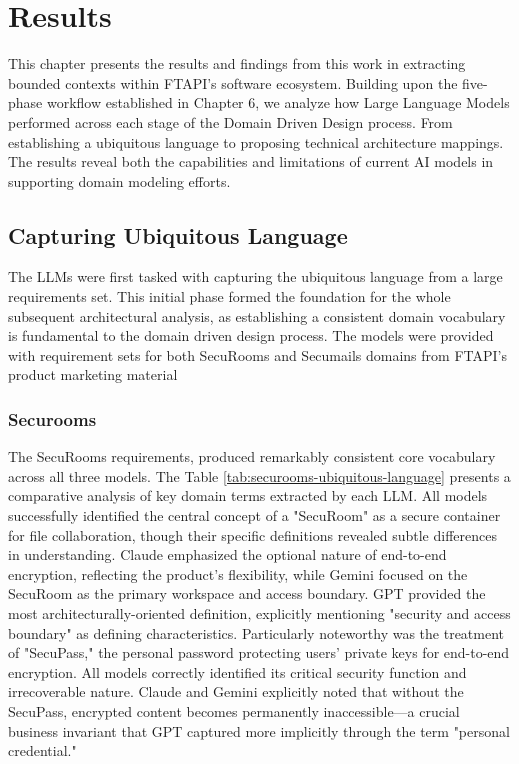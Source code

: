 \chapter{Results}\label{chapter:results}

This chapter presents the results and findings from this work in extracting bounded contexts within FTAPI's software ecosystem. Building upon the five-phase workflow established in Chapter 6, we analyze how Large Language Models performed across each stage of the Domain Driven Design process. From establishing a ubiquitous language to proposing technical architecture mappings. The results reveal both the capabilities and limitations of current AI models in supporting domain modeling efforts.

\section{Capturing Ubiquitous Language}
The LLMs were first tasked with capturing the ubiquitous language from a large requirements set. This initial phase formed the foundation for the whole subsequent architectural analysis, as establishing a consistent domain vocabulary is fundamental to the domain driven design process. The models were provided with requirement sets for both SecuRooms and Secumails domains from FTAPI's product marketing material

\subsection{Securooms}
The SecuRooms requirements, produced remarkably consistent core vocabulary across all three models. The Table \ref{tab:securooms-ubiquitous-language} presents a comparative analysis of key domain terms extracted by each LLM. All models successfully identified the central concept of a "SecuRoom" as a secure container for file collaboration, though their specific definitions revealed subtle differences in understanding. Claude emphasized the optional nature of end-to-end encryption, reflecting the product's flexibility, while Gemini focused on the SecuRoom as the primary workspace and access boundary. GPT provided the most architecturally-oriented definition, explicitly mentioning "security and access boundary" as defining characteristics. Particularly noteworthy was the treatment of "SecuPass," the personal password protecting users' private keys for end-to-end encryption. All models correctly identified its critical security function and irrecoverable nature. Claude and Gemini explicitly noted that without the SecuPass, encrypted content becomes permanently inaccessible—a crucial business invariant that GPT captured more implicitly through the term "personal credential."

